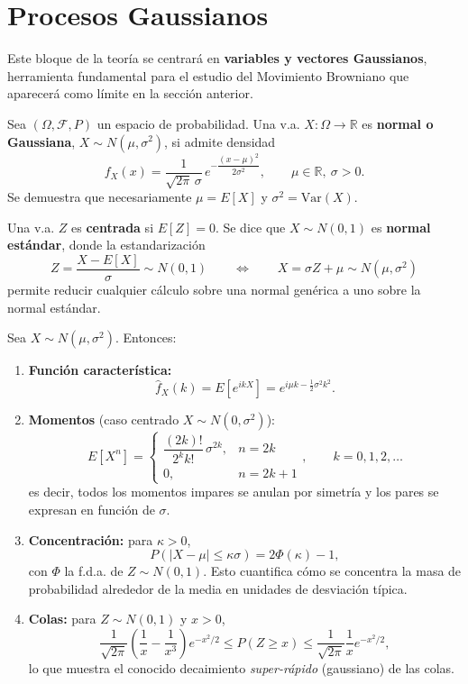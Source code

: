 
\chapter{Procesos Gaussianos}

\noindent
Este bloque de la teoría se centrará en \textbf{variables y vectores Gaussianos}, herramienta fundamental para el estudio del Movimiento Browniano que aparecerá como límite en la sección anterior.

\begin{definicion}
    Sea $(\Omega,\mathcal{F},P)$ un espacio de probabilidad. Una v.a. $X:\Omega \to \mathbb{R}$ es \textbf{normal o Gaussiana}, $X\sim N(\mu,\sigma^2)$, si admite densidad
    \[
    f_X(x) = \frac{1}{\sqrt{2\pi}\,\sigma}\, e^{-\dfrac{(x-\mu)^2}{2\sigma^2}}, \qquad \mu\in\mathbb{R},\ \sigma>0.
    \]
    Se demuestra que necesariamente $\mu=E[X]$ y $\sigma^2=\text{Var}(X)$.
\end{definicion}

\begin{definicion}
    Una v.a. $Z$ es \textbf{centrada} si $E[Z]=0$. Se dice que $X\sim N(0,1)$ es \textbf{normal estándar}, donde la estandarización
    \[
    Z = \frac{X-E[X]}{\sigma} \sim N(0,1) \qquad\Longleftrightarrow\qquad X = \sigma Z + \mu \sim N(\mu,\sigma^2)
    \]
    permite reducir cualquier cálculo sobre una normal genérica a uno sobre la normal estándar.
\end{definicion}

\begin{prop}
Sea $X\sim N(\mu,\sigma^2)$. Entonces:
\begin{enumerate}
    \item \textbf{Función característica:}
    \[
    \hat{f}_X(k) = E[e^{ikX}] = e^{i\mu k - \frac{1}{2}\sigma^2 k^2}.
    \]
    \item \textbf{Momentos} (caso centrado $X\sim N(0,\sigma^2)$):
    \[
    E[X^n] = \begin{cases} \dfrac{(2k)!}{2^k k!}\,\sigma^{2k}, & n=2k \\ 0, & n=2k+1\end{cases}, \qquad k=0,1,2,\dots
    \]
    es decir, todos los momentos impares se anulan por simetría y los pares se expresan en función de $\sigma$.
    \item \textbf{Concentración:} para $\kappa>0$,
    \[
    P(|X-\mu|\le \kappa\sigma) = 2\Phi(\kappa)-1,
    \]
    con $\Phi$ la f.d.a. de $Z\sim N(0,1)$. Esto cuantifica cómo se concentra la masa de probabilidad alrededor de la media en unidades de desviación típica.
    \item \textbf{Colas:} para $Z\sim N(0,1)$ y $x>0$,
    \[
    \frac{1}{\sqrt{2\pi}}\left(\frac{1}{x}-\frac{1}{x^3}\right)e^{-x^2/2} \le P(Z\ge x) \le \frac{1}{\sqrt{2\pi}}\frac{1}{x}e^{-x^2/2},
    \]
    lo que muestra el conocido decaimiento \textit{super-rápido} (gaussiano) de las colas.
\end{enumerate}
\end{prop}

